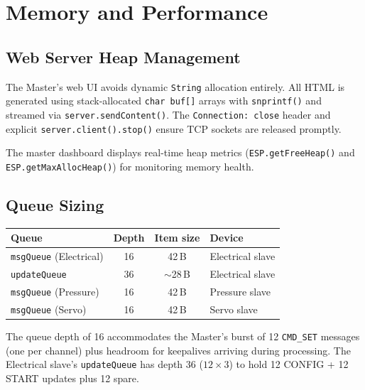 \documentclass[11pt,a4paper]{article}
\begin{document}
\section{Memory and Performance}

\subsection{Web Server Heap Management}

The Master's web UI avoids dynamic \texttt{String} allocation entirely. All
HTML is generated using stack-allocated \texttt{char buf[]} arrays with
\texttt{snprintf()} and streamed via \texttt{server.sendContent()}. The
\texttt{Connection: close} header and explicit \texttt{server.client().stop()}
ensure TCP sockets are released promptly.

The master dashboard displays real-time heap metrics (\texttt{ESP.getFreeHeap()}
and \texttt{ESP.getMaxAllocHeap()}) for monitoring memory health.

\subsection{Queue Sizing}

\begin{center}
\begin{tabular}{lccl}
\toprule
\textbf{Queue} & \textbf{Depth} & \textbf{Item size} & \textbf{Device} \\
\midrule
\texttt{msgQueue} (Electrical)  & 16 & 42\,B & Electrical slave \\
\texttt{updateQueue}            & 36 & $\sim$28\,B & Electrical slave \\
\texttt{msgQueue} (Pressure)    & 16 & 42\,B & Pressure slave \\
\texttt{msgQueue} (Servo)       & 16 & 42\,B & Servo slave \\
\bottomrule
\end{tabular}
\end{center}

The queue depth of 16 accommodates the Master's burst of 12 \texttt{CMD\_SET}
messages (one per channel) plus headroom for keepalives arriving during
processing. The Electrical slave's \texttt{updateQueue} has depth 36
($12 \times 3$) to hold 12 CONFIG + 12 START updates plus 12 spare.

\end{document}
